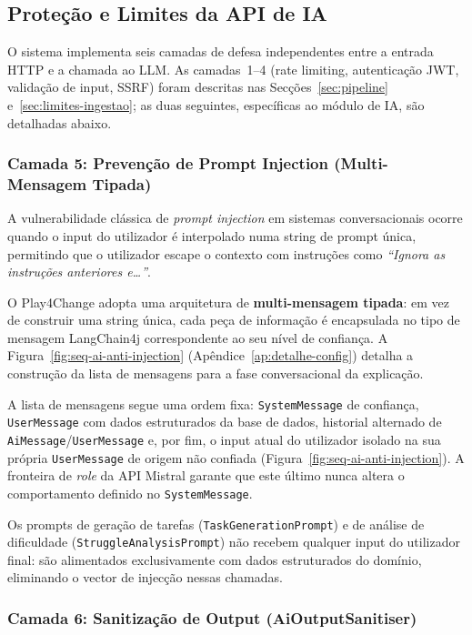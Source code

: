 \subsection{Proteção e Limites da API de IA} \label{sec:protecao-ia}

O sistema implementa seis camadas de defesa independentes entre a entrada HTTP e a chamada ao LLM. As camadas~1--4 (rate limiting, autenticação JWT, validação de input, SSRF) foram descritas nas Secções~\ref{sec:pipeline} e~\ref{sec:limites-ingestao}; as duas seguintes, específicas ao módulo de IA, são detalhadas abaixo.

\subsubsection*{Camada 5: Prevenção de Prompt Injection (Multi-Mensagem Tipada)}

A vulnerabilidade clássica de \textit{prompt injection} em sistemas conversacionais ocorre quando o input do utilizador é interpolado numa string de prompt única, permitindo que o utilizador escape o contexto com instruções como \textit{``Ignora as instruções anteriores e\ldots''}.

O Play4Change adopta uma arquitetura de \textbf{multi-mensagem tipada}: em vez de construir uma string única, cada peça de informação é encapsulada no tipo de mensagem LangChain4j correspondente ao seu nível de confiança.
A Figura~\ref{fig:seq-ai-anti-injection} (Apêndice~\ref{ap:detalhe-config}) detalha a construção da lista de mensagens para a fase conversacional da explicação.

A lista de mensagens segue uma ordem fixa: \texttt{SystemMessage} de confiança, \texttt{UserMessage} com dados estruturados da base de dados, historial alternado de \texttt{AiMessage}/\texttt{UserMessage} e, por fim, o input atual do utilizador isolado na sua própria \texttt{UserMessage} de origem não confiada (Figura~\ref{fig:seq-ai-anti-injection}). A fronteira de \textit{role} da API Mistral garante que este último nunca altera o comportamento definido no \texttt{SystemMessage}.

Os prompts de geração de tarefas (\texttt{TaskGenerationPrompt}) e de análise de dificuldade (\texttt{StruggleAnalysisPrompt}) não recebem qualquer input do utilizador final: são alimentados exclusivamente com dados estruturados do domínio, eliminando o vector de injecção nessas chamadas.

\subsubsection*{Camada 6: Sanitização de Output (AiOutputSanitiser)}

